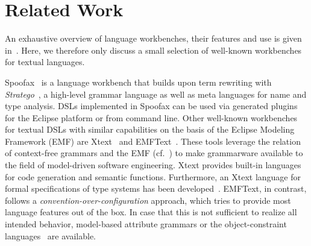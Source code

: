 \section{Related Work}
\label{sec:related_work}

An exhaustive
overview of language workbenches, their features and use is given
in~\cite{erdweg_workbenches_2013}. Here, we therefore only discuss a small selection
of well-known workbenches for textual languages. 

Spoofax~\cite{kats_spoofax_2010} is a language workbench that builds upon term
rewriting with {\it Stratego}~\cite{bravenboer_stratego_2008}, a high-level grammar
language as well as meta languages for name and type analysis. DSLs implemented in
Spoofax can be used via generated plugins for the Eclipse platform or from command
line. Other well-known workbenches for textual DSLs with similar capabilities on the
basis of the Eclipse Modeling Framework (EMF) are Xtext~\cite{eysoldt_xtext_2010} and
EMFText~\cite{heidenreich_derivation_2009}. These tools leverage the relation of
context-free grammars and the EMF (cf.~\cite{alanen_ebnf_mof_2003}) to make
grammarware available to the field of model-driven software engineering. Xtext
provides built-in languages for code generation and semantic functions. Furthermore,
an Xtext language for formal specifications of type systems has been
developed~\cite{bettini_implementing_2015}. EMFText, in contrast, follows a
\emph{convention-over-configuration} approach, which tries to provide most language
features out of the box. In case that this is not sufficient to realize all intended
behavior, model-based attribute grammars or the object-constraint
languages~\cite{buerger_reference_2011,heidenreich_model-based_2013} are available.

